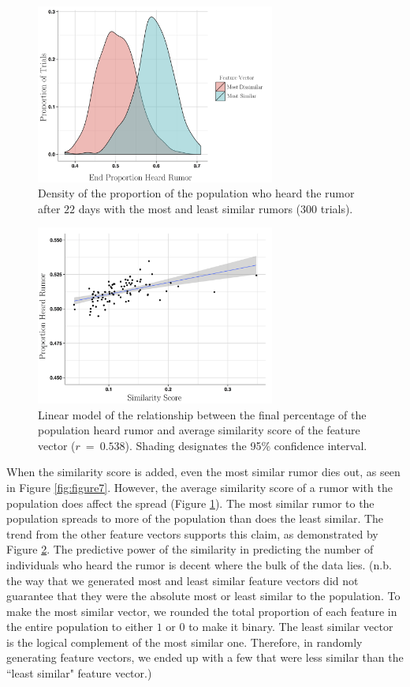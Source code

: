 \begin{figure}[H]
\captionsetup{width=0.8\textwidth}
\centering
    \includegraphics[width=0.7\textwidth]{figure8}
  \caption{ Density of the proportion of the population who heard the rumor after $ 22 $ days with the most and least similar rumors ($ 300 $ trials). }
  \label{fig:figure8}
\end{figure}

\begin{figure}[H]
\captionsetup{width=0.8\textwidth}
\centering
    \includegraphics[width=0.7\textwidth]{figure9}
  \caption{ Linear model of the relationship between the final percentage of the population heard rumor and average similarity score of the feature vector ($ r~=~0.538 $). Shading designates the 95\% confidence interval. }
  \label{fig:figure9}
\end{figure}

When the similarity score is added, even the most similar rumor dies out, as seen in Figure \ref{fig:figure7}. However, the average similarity score of a rumor with the population does affect the spread (Figure \ref{fig:figure8}). The most similar rumor to the population spreads to more of the population than does the least similar. The trend from the other feature vectors supports this claim, as demonstrated by Figure \ref{fig:figure9}. The predictive power of the similarity in predicting the number of individuals who heard the rumor is decent where the bulk of the data lies. (n.b. the way that we generated most and least similar feature vectors did not guarantee that they were the absolute most or least similar to the population. To make the most similar vector, we rounded the total proportion of each feature in the entire population to either $ 1 $ or $ 0 $ to make it binary. The least similar vector is the logical complement of the most similar one. Therefore, in randomly generating feature vectors, we ended up with a few that were less similar than the ``least similar" feature vector.)